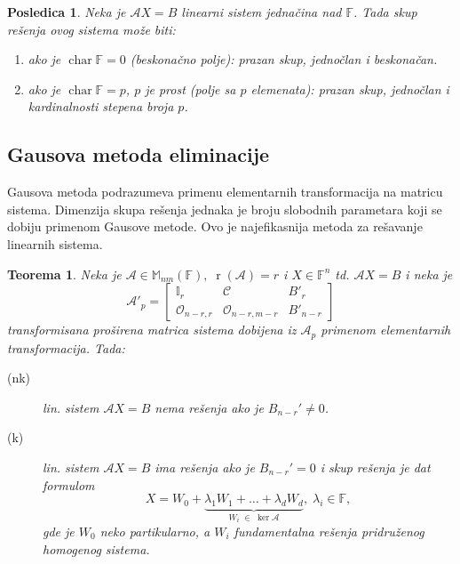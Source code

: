 \documentclass[a4paper,12pt,twoside]{report}
\newtheorem{theorem}{Teorema}[section]
\newtheorem{corollary}{Posledica}[theorem]
\numberwithin{algorithm}{section}
\begin{document}
\begin{corollary}
    Neka je $\mathcal{A}X = B$ linearni sistem jednačina nad $\mathbb{F}$. Tada skup rešenja ovog sistema može biti:
\begin{enumerate}
    \item ako je $\operatorname{char} \mathbb{F} = 0$ (beskonačno polje): prazan skup, jednočlan i beskonačan.
    \item ako je $\operatorname{char} \mathbb{F} = p$, $p$ je prost (polje sa $p$ elemenata): prazan skup, jednočlan i kardinalnosti stepena broja $p$.
\end{enumerate}
\end{corollary}

\subsection{Gausova metoda eliminacije}

Gausova metoda podrazumeva primenu elementarnih transformacija na matricu sistema. Dimenzija skupa rešenja jednaka je broju slobodnih parametara koji se dobiju 
primenom Gausove metode. Ovo je najefikasnija metoda za rešavanje linearnih sistema.

\begin{theorem}
    Neka je $\mathcal{A} \in \mathbb{M}_{nm}(\mathbb{F}), \; \operatorname{r}(\mathcal{A}) = r$ i $X \in \mathbb{F}^n$ td. $\mathcal{A}X = B$ i neka je 
    \[
    \mathcal{A}'_p = 
    \left[
    \begin{array}{cc|c}
    \mathbb{I}_r & \mathcal{C} & B'_r \\
    \mathcal{O}_{n-r, r} & \mathcal{O}_{n-r, m-r} & B'_{n-r}
    \end{array}
    \right]
    \] transformisana proširena matrica sistema dobijena iz $\mathcal{A}_p$ primenom elementarnih transformacija. Tada:
    \begin{description}
        \item[(nk)] lin. sistem $\mathcal{A}X = B$ nema rešenja ako je $B_{n-r}' \neq 0$.
        \item[(k)] lin. sistem $\mathcal{A}X = B$ ima rešenja ako je $B_{n-r}' = 0$ i skup rešenja je dat formulom
        \[ X = W_0 + \underbrace{\lambda_1W_1 + \dots + \lambda_dW_d}_{W_i \;\in\; \ker \mathcal{A}}, \; \lambda_i \in \mathbb{F}, \]
        gde je $W_0$ neko partikularno, a $W_i$ fundamentalna rešenja pridruženog homogenog sistema.
    \end{description}
\end{theorem}
\end{document}

